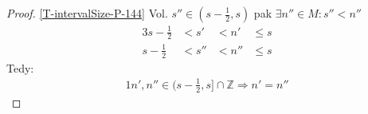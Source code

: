 \begin{proof}
	\ref{T-intervalSize-P-144} Vol. $s''\in (s-\frac{1}{2},s)$ pak $\exists n''\in M: s''<n''$
	\begin{alignat}{3}
		s-\frac{1}{2}&<s'&<n'&\leq s \\
		s-\frac{1}{2}&<s''&<n''&\leq s
	\end{alignat}
	Tedy:
	\begin{alignat}{1}
		n',n'' \in (s-\frac{1}{2},s]\cap\mathbb{Z}\Rightarrow n'=n''
	\end{alignat}
\end{proof}
